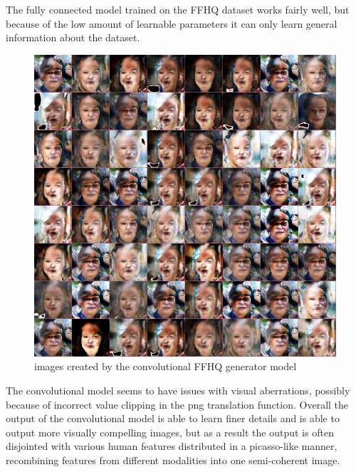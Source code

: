 The fully connected model trained on the FFHQ dataset works fairly well, but because of the low
amount of learnable parameters it can only learn general information about the dataset.

\begin{figure}
    \centering
    \includegraphics[width=\linewidth]{media/ffhq_cnn}
    \caption{images created by the convolutional FFHQ generator model}
    \label{fig:ffhq_cnn}
\end{figure}

The convolutional model seems to have issues with visual aberrations, possibly because of
incorrect value clipping in the png translation function.
Overall the output of the convolutional model is able to learn finer details and is able to
output more visually compelling images, but as a result the output is often disjointed with
various human features distributed in a picasso-like manner, recombining features from different
modalities into one semi-coherent image.

